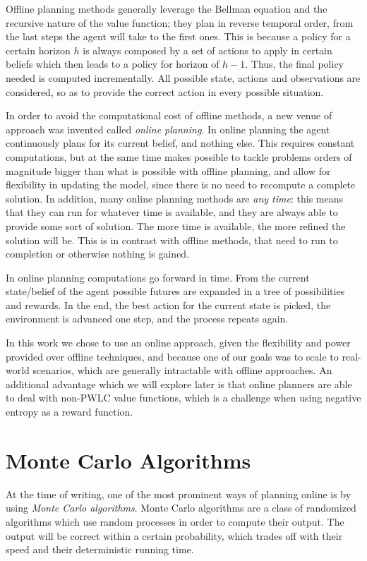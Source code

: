 Offline planning methods generally leverage the Bellman equation and the recursive nature of the
value function; they plan in reverse temporal order, from the last steps the agent will take to the
first ones. This is because a policy for a certain horizon $h$ is always composed by a set of
actions to apply in certain beliefs which then leads to a policy for horizon of $h-1$. Thus, the
final policy needed is computed incrementally. All possible state, actions and observations are
considered, so as to provide the correct action in every possible situation.

In order to avoid the computational cost of offline methods, a new venue of approach was invented
called \textit{online planning}. In online planning the agent continuously plans for its current
belief, and nothing else. This requires constant computations, but at the same time makes possible
to tackle problems orders of magnitude bigger than what is possible with offline planning, and allow
for flexibility in updating the model, since there is no need to recompute a complete solution. In
addition, many online planning methods are \textit{any time}: this means that they can run for
whatever time is available, and they are always able to provide some sort of solution. The more time
is available, the more refined the solution will be. This is in contrast with offline methods, that
need to run to completion or otherwise nothing is gained.

In online planning computations go forward in time. From the current state/belief of the agent
possible futures are expanded in a tree of possibilities and rewards. In the end, the best action
for the current state is picked, the environment is advanced one step, and the process repeats
again.

In this work we chose to use an online approach, given the flexibility and power provided over
offline techniques, and because one of our goals was to scale to real-world scenarios, which are
generally intractable with offline approaches. An additional advantage which we will explore later
is that online planners are able to deal with non-PWLC value functions, which is a challenge when
using negative entropy as a reward function.

\section{Monte Carlo Algorithms}

At the time of writing, one of the most prominent ways of planning online is by using \textit{Monte
Carlo algorithms}. Monte Carlo algorithms are a class of randomized algorithms which use random
processes in order to compute their output. The output will be correct within a certain probability,
which trades off with their speed and their deterministic running time.

